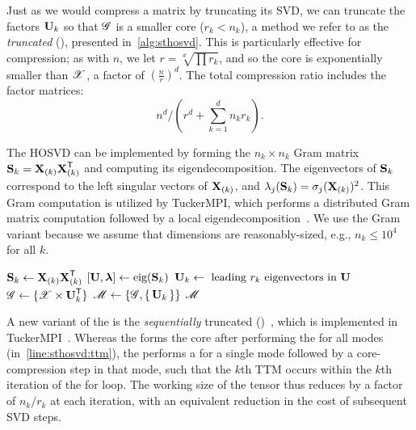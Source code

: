 Just as we would compress a matrix by truncating its SVD, we can truncate the factors 
$\Mn{U}{k}$ so that $\T{G}$ is a smaller core ($r_k < n_k$), a method we refer to as the 
\emph{truncated} \hosvd (\thosvd), presented in~\cref{alg:sthosvd}.
This is particularly effective for compression; as with $n$, we let $r=\sqrt[d]{\prod r_k}$, and so 
the core is exponentially smaller than $\T{X}$, a factor of $(\frac{n}{r})^d$. 
The total compression ratio includes the factor matrices:
\begin{equation}
\label{eqn:compression}
n^d / \left(r^d + \sum_{k=1}^d n_k r_k\right).
\end{equation}

The HOSVD can be
implemented by forming the $n_k \times n_k$ Gram matrix $\M{S}_k = \M{X}_{(k)}\M{X}_{(k)}^\trans$ 
and computing its eigendecomposition. The eigenvectors of $\M{S}_k$ correspond to the left
singular vectors of $\M{X}_{(k)}$, and $\lambda_j(\M{S}_k) = \sigma_j(\M{X}_{(k)})^2$. 
This Gram computation is utilized by TuckerMPI, which performs a distributed Gram matrix 
computation followed by a local eigendecomposition~\cite{AuBaKo16}.
We use the Gram variant because we 
assume that dimensions are reasonably-sized, e.g., $n_k \leq 10^4$ for all $k$.

\begin{algorithm}[htb]
  \caption{\thosvd{}}
  \begin{algorithmic}[1]
    \State $\M{S}_k \gets \M{X}_{(k)}\M{X}_{(k)}^\trans $ 
    \State $[\M{U},\M{\lambda}] \gets \text{eig}(\M{S}_k)$ 
    \State \label{line:sthosvd:svd} $\Mn{U}{k} \gets \text{ leading $r_k$ eigenvectors in $\M{U}$}$
    \EndFor
    \State \label{line:sthosvd:trunc} $\T{G} \gets \{ \T{X} \times \Mn{U}{k}^\trans\}$ 
    \State $\T{M} \gets \{ \T{G}, \set{\Mn{U}{k}} \}$ \label{line:sthosvd:ttm}
    \State \Return $\T{M}$
    \EndProcedure
  \end{algorithmic}
  \label{alg:sthosvd}
\end{algorithm}
%
A new variant of the \thosvd is the \emph{sequentially} truncated \hosvd (\sthosvd)~\cite{sthosvd}, 
which is implemented in TuckerMPI~\cite{AuBaKo16}. Whereas the \thosvd forms the core 
after performing the \MTFSBC for all modes (in~\cref{line:sthosvd:ttm}), 
the \sthosvd performs a \MTFSBC for a single mode followed by a core-compression step in that mode,
such that the $k$th TTM occurs within the $k$th iteration of the for loop. 
The working size of the tensor thus reduces by a 
factor of $n_k / r_k$ at each iteration, with an equivalent reduction in the cost of subsequent SVD steps.
%

